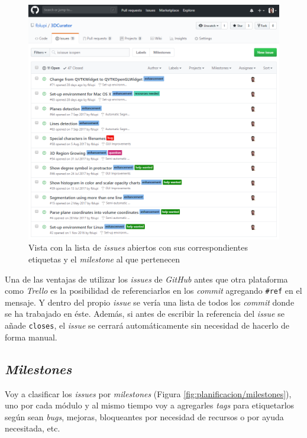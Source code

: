 \begin{figure}[H]
	\centering
	\includegraphics[width=12cm]{imagenes/planificacion/issues}
	\caption{Vista con la lista de \textit{issues} abiertos con sus correspondientes etiquetas y el \textit{milestone} al que pertenecen}
	\label{fig:planificacion/issues}
\end{figure}

Una de las ventajas de utilizar los \textit{issues} de \textit{GitHub} antes que otra plataforma como \textit{Trello} es la posibilidad de referenciarlos en los \textit{commit} agregando \texttt{\#ref} en el mensaje. Y dentro del propio \textit{issue} se vería una lista de todos los \textit{commit} donde se ha trabajado en éste. Además, si antes de escribir la referencia del \textit{issue} se añade \texttt{closes}, el \textit{issue} se cerrará automáticamente sin necesidad de hacerlo de forma manual.

\subsection{\textit{Milestones}}

Voy a clasificar los \textit{issues} por \textit{milestones} (Figura \ref{fig:planificacion/milestones}), uno por cada módulo y al mismo tiempo voy a agregarles \textit{tags} para etiquetarlos según sean \textit{bugs}, mejoras, bloqueantes por necesidad de recursos o por ayuda necesitada, etc.


